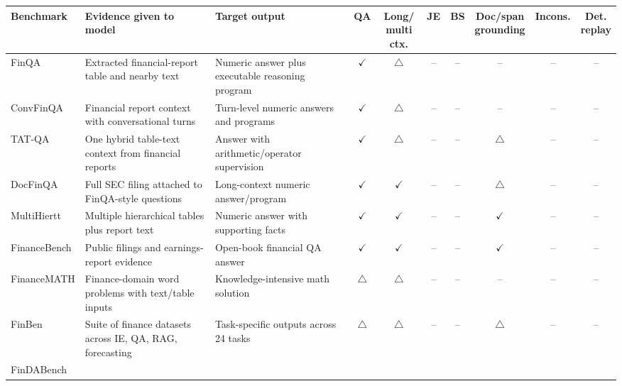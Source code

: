 \begin{table}[t!]
\centering
\footnotesize
\setlength{\tabcolsep}{2.4pt}
\renewcommand{\arraystretch}{1.06}
\newcommand{\yes}{\(\checkmark\)}
\newcommand{\partly}{\(\triangle\)}
\newcommand{\no}{--}
\begin{tabularx}{\linewidth}{@{}>{\raggedright\arraybackslash}p{2.05cm}>{\raggedright\arraybackslash}p{3.25cm}>{\raggedright\arraybackslash}p{2.65cm}ccccccc@{}}
\toprule
Benchmark & Evidence given to model & Target output & QA & \shortstack{Long/\\multi ctx.} & JE & BS & \shortstack{Doc/span\\grounding} & Incons. & \shortstack{Det.\\replay} \\
\midrule
FinQA \citep{chen-etal-2021-finqa}
& Extracted financial-report table and nearby text
& Numeric answer plus executable reasoning program
& \yes & \partly & \no & \no & \no & \no & \no \\
ConvFinQA \citep{chen-etal-2022-convfinqa}
& Financial report context with conversational turns
& Turn-level numeric answers and programs
& \yes & \partly & \no & \no & \no & \no & \no \\
TAT-QA \citep{zhu-etal-2021-tatqa}
& One hybrid table-text context from financial reports
& Answer with arithmetic/operator supervision
& \yes & \partly & \no & \no & \partly & \no & \no \\
DocFinQA \citep{reddy-etal-2024-docfinqa}
& Full SEC filing attached to FinQA-style questions
& Long-context numeric answer/program
& \yes & \yes & \no & \no & \partly & \no & \no \\
MultiHiertt \citep{zhao-etal-2022-multihiertt}
& Multiple hierarchical tables plus report text
& Numeric answer with supporting facts
& \yes & \yes & \no & \no & \yes & \no & \no \\
FinanceBench \citep{islam2023financebench}
& Public filings and earnings-report evidence
& Open-book financial QA answer
& \yes & \yes & \no & \no & \yes & \no & \no \\
FinanceMATH \citep{zhao-etal-2024-financemath}
& Finance-domain word problems with text/table inputs
& Knowledge-intensive math solution
& \partly & \partly & \no & \no & \no & \no & \no \\
FinBen \citep{xie2024finben}
& Suite of finance datasets across IE, QA, RAG, forecasting
& Task-specific outputs across 24 tasks
& \partly & \partly & \no & \no & \partly & \no & \no \\
FinDABench \citep{liu-etal-2025-findabench}

\end{tabularx}
\end{table}
